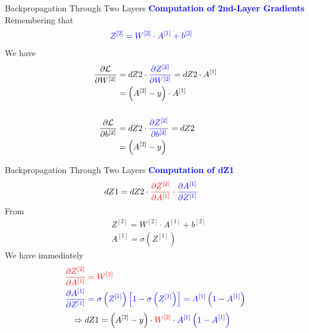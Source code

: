 \documentclass[aspectratio=169]{beamer}
\begin{document}
\begin{frame}{Backpropagation Through Two Layers}
\textbf{\textcolor{blue}{Computation of 2nd-Layer Gradients}}\\
Remembering that
\begin{align*}
&\textcolor{blue}{Z^{[2]} = W^{[2]} \cdot A^{[1]} + b^{[2]}} 
\end{align*}
We have 
\begin{align*}
\frac{\partial \mathcal{L}}{\partial W^{[2]}} &= dZ2 \cdot \textcolor{blue}{\frac{\partial Z^{[2]}}{\partial W^{[2]}}} = dZ2 \cdot A^{[1]} \\
&= \left( A^{[2]} - y \right) \cdot A^{[1]} 
\\&\\
\frac{\partial \mathcal{L}}{\partial b^{[2]}} &= dZ2 \cdot \textcolor{blue}{\frac{\partial Z^{[2]}}{\partial b^{[2]}}} = dZ2 \\
&= \left( A^{[2]} - y \right)
\end{align*}
\end{frame}
%
%
\begin{frame}{Backpropagation Through Two Layers}
\textbf{\textcolor{blue}{Computation of dZ1}}
\begin{align*}
&dZ1 = dZ2 
\cdot 
\textcolor{red}{\frac{\partial Z^{[2]}}{\partial A^{[1]}}} 
\cdot 
\textcolor{blue}{\frac{\partial A^{[1]}}{\partial Z^{[1]}}}
\end{align*}
From
\begin{align*}
&Z^{[2]} = W^{[2]} \cdot A^{[1]} + b^{[2]} \\
&A^{[1]} = \sigma\left(Z^{[1]}\right)
\end{align*}
We have immediately
\begin{align*}
&\textcolor{red}{\frac{\partial Z^{[2]}}{\partial A^{[1]}}  = W^{[2]}} 
\\
&\textcolor{blue}{\frac{\partial A^{[1]}}{\partial Z^{[1]}} = 
\sigma\left( Z^{[1]} \right) \left[ 1-\sigma \left( Z^{[1]} \right) \right]
= A^{[1]} \left( 1 - A^{[1]} \right)}
\end{align*}
\begin{align*}
&\Rightarrow dZ1 = \left( A^{[2]} - y \right)
\cdot 
\textcolor{red}{W^{[2]}} 
\cdot
\textcolor{blue}{A^{[1]} \left( 1 - A^{[1]} \right)} 
\end{align*}
\end{frame}
%
%
\end{document}

